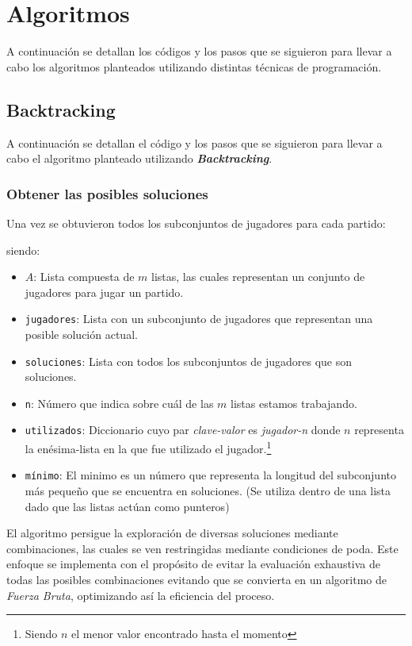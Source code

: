 \section{Algoritmos}

A continuación se detallan los códigos y los pasos que se siguieron para llevar a cabo los algoritmos planteados utilizando distintas técnicas de programación.

\subsection{Backtracking}

A continuación se detallan el código y los pasos que se siguieron para llevar a cabo el algoritmo planteado utilizando \textbf{\textit{Backtracking}}.

\subsubsection{Obtener las posibles soluciones}

Una vez se obtuvieron todos los subconjuntos de jugadores para cada partido:



siendo:
\begin{itemize}
    \item $A$: Lista compuesta de $m$ listas, las cuales representan un conjunto de jugadores para jugar un partido.
    \item \texttt{jugadores}: Lista con un subconjunto de jugadores que representan una posible solución actual.
    \item \texttt{soluciones}: Lista con todos los subconjuntos de jugadores que son soluciones.
    \item \texttt{n}: Número que indica sobre cuál de las $m$ listas estamos trabajando.
    \item \texttt{utilizados}: Diccionario cuyo par \textit{clave-valor} es \textit{jugador-n} donde $n$ representa la enésima-lista en la que fue utilizado el jugador.\footnote{Siendo $n$ el menor valor encontrado hasta el momento}
    \item \texttt{mínimo}: El minimo es un número que representa la longitud del subconjunto más pequeño que se encuentra en soluciones. (Se utiliza dentro de una lista dado que las listas actúan como punteros)
\end{itemize}

El algoritmo persigue la exploración de diversas soluciones mediante combinaciones, las cuales se ven restringidas mediante condiciones de poda. Este enfoque se implementa con el propósito de evitar la evaluación exhaustiva de todas las posibles combinaciones evitando que se convierta en un algoritmo de \textit{Fuerza Bruta}, optimizando así la eficiencia del proceso.

